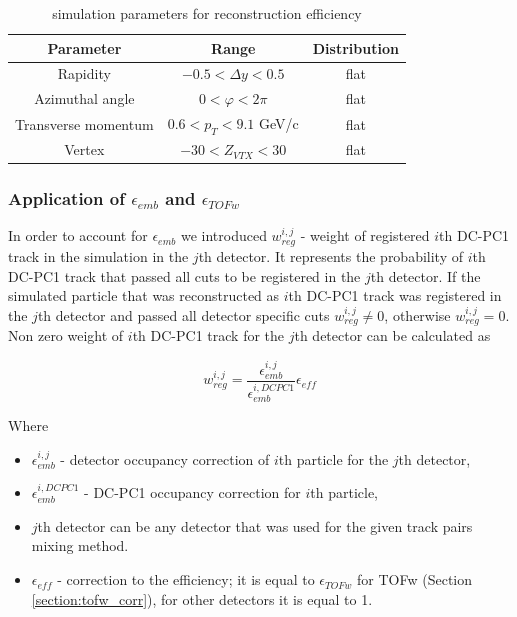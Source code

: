 \begin{table}[h!]
	\centering
	\begin{tabular}{c||c|c}
		Parameter & Range & Distribution \\
		\hline
		\hline
		Rapidity & $-0.5 < \Delta y < 0.5$ & flat \\
		Azimuthal angle & $0 < \varphi < 2\pi$ & flat \\
		Transverse momentum & $0.6 < p_T < 9.1$ GeV/c & flat \\
		Vertex & $-30 < Z_{VTX} < 30$ & flat \\
	\end{tabular}
	\caption{\Kstar simulation parameters for reconstruction efficiency}
	\label{table:kstar_sim_par}
\end{table}

\subsubsection{Application of $\epsilon_{emb}$ and $\epsilon_{TOFw}$}

In order to account for $\epsilon_{emb}$ we introduced $w_{reg}^{i, j}$ - weight of registered $i$th DC-PC1 track in the simulation in the $j$th detector. It represents the probability of $i$th DC-PC1 track that passed all cuts to be registered in the $j$th detector. If the simulated particle that was reconstructed as $i$th DC-PC1 track was registered in the $j$th detector and passed all detector specific cuts $w_{reg}^{i,j} \neq 0$, otherwise $w_{reg}^{i,j} = 0$. Non zero weight of $i$th DC-PC1 track for the $j$th detector can be calculated as

\begin{equation}
	w_{reg}^{i,j} = \frac{\epsilon_{emb}^{i,j}}{\epsilon_{emb}^{i, DCPC1}} \epsilon_{eff}
	\label{eq:reg_weight}
\end{equation}

Where
\begin{itemize}
	\item $\epsilon_{emb}^{i, j}$ - detector occupancy correction of $i$th particle for the $j$th detector,
	\item $\epsilon_{emb}^{i, DCPC1}$ - DC-PC1 occupancy correction for $i$th particle,
	\item $j$th detector can be any detector that was used for the given track pairs mixing method.
	\item $\epsilon_{eff}$ - correction to the efficiency; it is equal to $\epsilon_{TOFw}$ for TOFw (Section \ref{section:tofw_corr}), for other detectors it is equal to 1.
\end{itemize}

